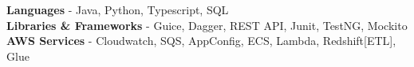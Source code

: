 \newcommand{\skillItem}[2]{
    \textbf{#1} - #2 \\
}

\section{}

\skillItem{Languages}{Java, Python, Typescript, SQL}
\skillItem{Libraries \& Frameworks}{Guice, Dagger, REST API, Junit, TestNG, Mockito}
\skillItem{AWS Services}{Cloudwatch, SQS, AppConfig, ECS, Lambda, Redshift[ETL], Glue}
